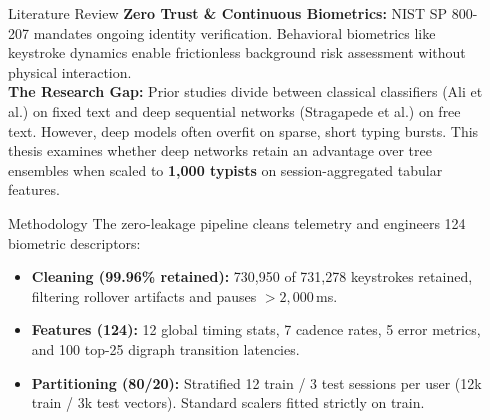 \documentclass[final]{beamer}
\newlength{\sepwidth}
\newlength{\colwidth}
\newcommand{\separatorcolumn}{\begin{column}{\sepwidth}\end{column}}
\begin{document}
\begin{frame}[t]
\begin{columns}[t]
\separatorcolumn

\begin{column}{\colwidth}

  \begin{block}{Literature Review}
    \textbf{Zero Trust \& Continuous Biometrics:} NIST SP 800-207 mandates ongoing identity verification. Behavioral biometrics like keystroke dynamics enable frictionless background risk assessment without physical interaction.\\
    \textbf{The Research Gap:} Prior studies divide between classical classifiers (Ali et al.) on fixed text and deep sequential networks (Stragapede et al.) on free text. However, deep models often overfit on sparse, short typing bursts. This thesis examines whether deep networks retain an advantage over tree ensembles when scaled to \textbf{1{,}000 typists} on session-aggregated tabular features.
  \end{block}

  \begin{block}{Methodology}
    The zero-leakage pipeline cleans telemetry and engineers 124 biometric descriptors:
    \begin{itemize}
      \item \textbf{Cleaning (99.96\% retained):} 730{,}950 of 731{,}278 keystrokes retained, filtering rollover artifacts and pauses $>2{,}000$\,ms.
      \item \textbf{Features (124):} 12 global timing stats, 7 cadence rates, 5 error metrics, and 100 top-25 digraph transition latencies.
      \item \textbf{Partitioning (80/20):} Stratified 12 train / 3 test sessions per user (12k train / 3k test vectors). Standard scalers fitted strictly on train.
    \end{itemize}

    \vspace{0.2em}
    \begin{figure}[H]
    \centering
\end{figure}
\end{block}
\end{column}
\end{columns}
\end{frame}
\end{document}
